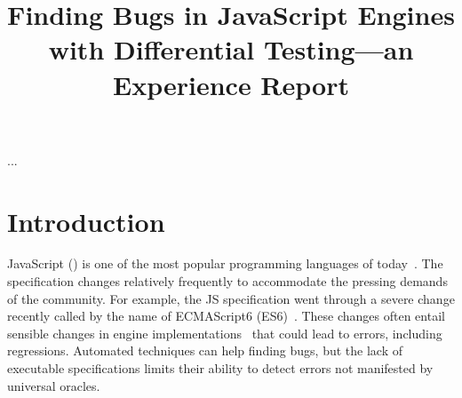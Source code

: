 \documentclass[10pt,conference,anonymous]{IEEEtran}
\begin{document}
\title{Finding Bugs in JavaScript Engines with Differential
  Testing---an Experience Report}


\maketitle

\begin{abstract}
\end{abstract}

\begin{IEEEkeywords}
...
\end{IEEEkeywords}

\section{Introduction}

JavaScript (\js{}) is one of the most popular programming languages of
today~\cite{business-insider,stackify}. The \js{} specification
changes relatively frequently to accommodate the pressing demands of
the community. For example, the JS specification went through a severe
change recently called by the name of ECMAScript6
(ES6)~\cite{es6-features}.  These changes often entail sensible
changes in engine implementations~\cite{kangax} that could lead to
errors, including regressions. Automated techniques can help finding
bugs, but the lack of executable specifications limits their ability
to detect errors not manifested by universal oracles.
\end{document}
